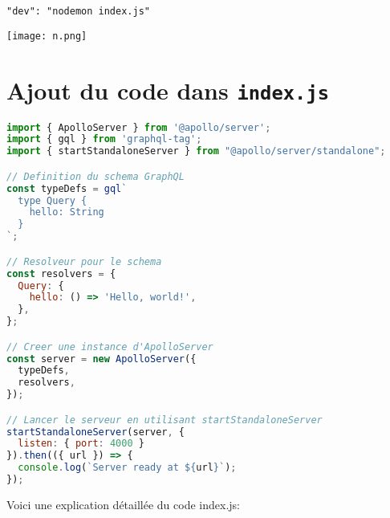 \documentclass{article}
\begin{document}
\begin{lstlisting}[style=custombash]
"dev": "nodemon index.js"
\end{lstlisting}

\begin{center}
\texttt{[image: n.png]}
\end{center}

\section{Ajout du code dans \texttt{index.js}}
\begin{lstlisting}[language=JavaScript ]
import { ApolloServer } from '@apollo/server';
import { gql } from 'graphql-tag';
import { startStandaloneServer } from "@apollo/server/standalone"; 

// Definition du schema GraphQL
const typeDefs = gql`
  type Query {
    hello: String
  }
`;

// Resolveur pour le schema
const resolvers = {
  Query: {
    hello: () => 'Hello, world!',
  },
};

// Creer une instance d'ApolloServer
const server = new ApolloServer({
  typeDefs,
  resolvers,
});

// Lancer le serveur en utilisant startStandaloneServer
startStandaloneServer(server, {
  listen: { port: 4000 }
}).then(({ url }) => {
  console.log(`Server ready at ${url}`);
});

\end{lstlisting}


Voici une explication détaillée du code index.js:
\end{document}
